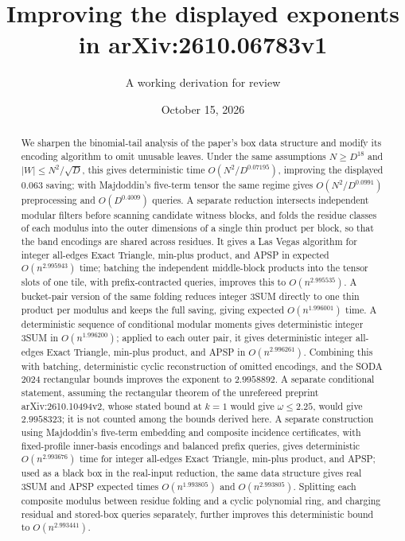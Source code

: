 \documentclass[11pt]{article}
\title{Improving the displayed exponents in arXiv:2610.06783v1}
\author{A working derivation for review}
\date{October 15, 2026}
\begin{document}
\maketitle
\begin{abstract}
We sharpen the binomial-tail analysis of the paper's box data structure and
modify its encoding algorithm to omit unusable leaves. Under the same
assumptions $N\ge D^{18}$ and $|W|\le N^2/\sqrt D$, this gives deterministic
time $O(N^2/D^{0.07195})$, improving the displayed $0.063$ saving; with
Majdoddin's five-term tensor the same regime gives $O(N^2/D^{0.0991})$
preprocessing and $O(D^{0.4009})$ queries.
A separate reduction intersects independent modular filters before scanning
candidate witness blocks, and folds the residue classes of each modulus into
the outer dimensions of a single thin product per block, so that the band
encodings are shared across residues. It gives a Las Vegas algorithm for
integer all-edges Exact Triangle, min-plus product, and APSP in expected
$O(n^{2.995943})$ time; batching the independent middle-block products into
the tensor slots of one tile, with prefix-contracted queries, improves this
to $O(n^{2.995535})$. A bucket-pair version of the same folding reduces
integer 3SUM directly to one thin product per modulus and keeps the full
saving, giving expected $O(n^{1.996001})$ time. A deterministic sequence of
conditional modular moments gives deterministic integer 3SUM in
$O(n^{1.996200})$; applied to each outer pair, it gives deterministic integer all-edges Exact
Triangle, min-plus product, and APSP in $O(n^{2.996261})$. Combining this
with batching, deterministic cyclic reconstruction of omitted encodings,
and the SODA 2024 rectangular bounds improves the exponent to
$2.9958892$. A separate conditional statement, assuming the rectangular theorem of the
unrefereed preprint arXiv:2610.10494v2, whose stated bound at $k=1$ would
give $\omega\le2.25$, would give $2.9958323$; it is not counted among the
bounds derived here. A separate construction using
Majdoddin's five-term embedding and composite incidence certificates,
with fixed-profile inner-basis encodings and balanced prefix queries, gives deterministic
$O(n^{2.993676})$ time for integer all-edges Exact Triangle, min-plus product,
and APSP; used as a black box in the real-input reduction, the same data
structure gives real 3SUM and APSP expected times $O(n^{1.993805})$ and
$O(n^{2.993805})$. Splitting each composite modulus between residue folding and a
cyclic polynomial ring, and charging residual and stored-box queries
separately, further improves this deterministic bound to $O(n^{2.993441})$.

\end{abstract}
\end{document}
